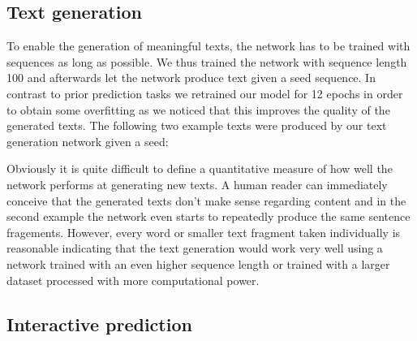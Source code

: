 \documentclass[11pt,a4paper,bibliography=totocnumbered,listof=totocnumbered]{scrartcl}
\begin{document}
\subsection{Text generation} \label{ssec:tg}
To enable the generation of meaningful texts, the network has to be trained with sequences as long as possible. We thus trained the network with sequence length 100 and afterwards let the network produce text given a seed sequence. In contrast to prior prediction tasks we retrained our model for 12 epochs in order to obtain some overfitting as we noticed that this improves the quality of the generated texts. 
The following two example texts were produced by our text generation network given a seed:




Obviously it is quite difficult to define a quantitative measure of how well the network performs at generating new texts. A human reader can immediately conceive that the generated texts don't make sense regarding content and in the second example the network even starts to repeatedly produce the same sentence fragements. However, every word or smaller text fragment taken individually is reasonable indicating that the text generation would work very well using a network trained with an even higher sequence length or trained with a larger dataset processed with more computational power.


\subsection{Interactive prediction}
\end{document}
